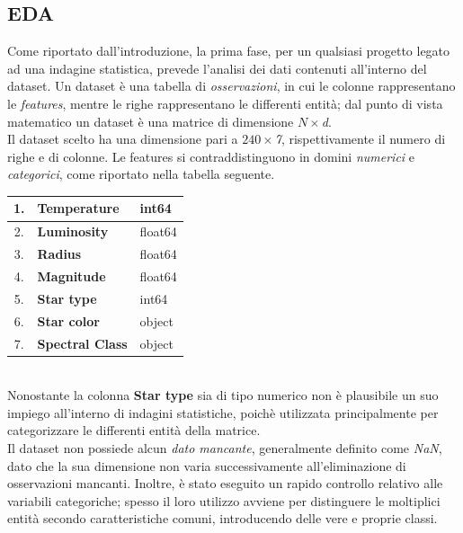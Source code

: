 \documentclass{article}
\begin{document}
    \subsection*{EDA}
    Come riportato dall'introduzione, la prima fase, per un qualsiasi progetto legato ad una indagine statistica, prevede l'analisi dei dati contenuti all'interno del dataset. Un dataset è una tabella di \textit{osservazioni}, in cui le colonne rappresentano le \textit{features}, mentre le righe rappresentano le differenti entità; dal punto di vista matematico un dataset è una matrice di dimensione \textit{$N \times $d}. \vspace*{7pt}\\
    Il dataset scelto ha una dimensione pari a \textit{$240 \times $7}, rispettivamente il numero di righe e di colonne. Le features si contraddistinguono in domini \textit{numerici} e \textit{categorici}, come riportato nella tabella seguente. \vspace*{7pt}\\
    \begin{tabularx}{\textwidth}{|c|X|X|}
        \hline
        1. & \textbf{Temperature} & int64 \\
        \hline
        2. & \textbf{Luminosity} & float64 \\
        \hline
        3. & \textbf{Radius} & float64 \\
        \hline
        4. & \textbf{Magnitude} & float64 \\
        \hline
        5. & \textbf{Star type} & int64 \\
        \hline
        6. & \textbf{Star color} & object \\
        \hline
        7. & \textbf{Spectral Class} & object \\
        \hline
    \end{tabularx} \vspace*{7pt}\\
    Nonostante la colonna \textbf{Star type} sia di tipo numerico non è plausibile un suo impiego all'interno di indagini statistiche, poichè utilizzata principalmente per categorizzare le differenti entità della matrice. \vspace*{7pt}\\
    Il dataset non possiede alcun \textit{dato mancante}, generalmente definito come \textit{NaN}, dato che la sua dimensione non varia successivamente all'eliminazione di osservazioni mancanti. Inoltre, è stato eseguito un rapido controllo relativo alle variabili categoriche; spesso il loro utilizzo avviene per distinguere le moltiplici entità secondo caratteristiche comuni, introducendo delle vere e proprie classi.    
\end{document}

